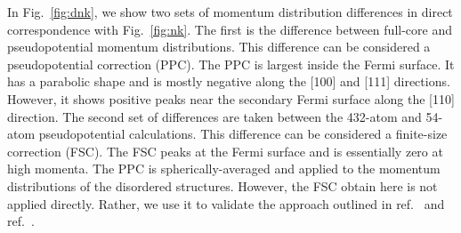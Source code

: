 \documentclass[aps,prb,showpacs,preprintnumbers,amsmath,amssymb,superscriptaddress,twocolumn]{revtex4-1}
\begin{document}
In Fig.~\ref{fig:dnk}, we show two sets of momentum distribution differences in direct correspondence with Fig.~\ref{fig:nk}. The first is the difference between full-core and pseudopotential momentum distributions. This difference can be considered a pseudopotential correction (PPC). The PPC is largest inside the Fermi surface. It has a parabolic shape and is mostly negative along the [100] and [111] directions. However, it shows positive peaks near the secondary Fermi surface along the [110] direction. The second set of differences are taken between the 432-atom and 54-atom pseudopotential calculations. This difference can be considered a finite-size correction (FSC). The FSC peaks at the Fermi surface and is essentially zero at high momenta. The PPC is spherically-averaged and applied to the momentum distributions of the disordered structures. However, the FSC obtain here is not applied directly. Rather, we use it to validate the approach outlined in ref.~\cite{Holzmann2009} and ref.~\cite{Holzmann2011}.
\end{document}

